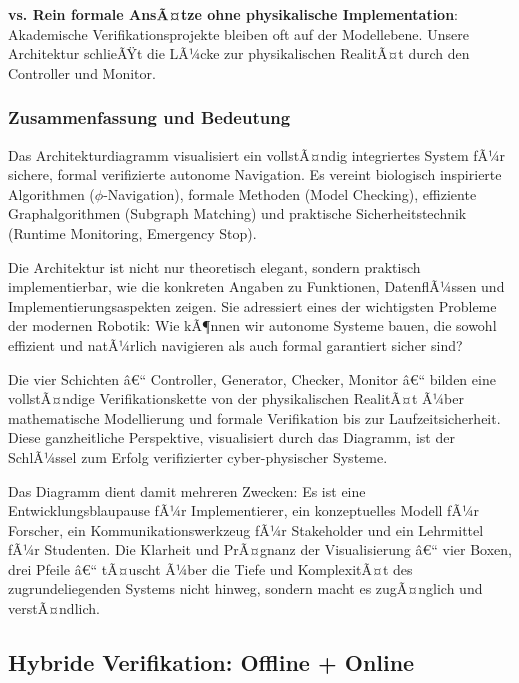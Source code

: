 ﻿\documentclass[a4paper,12pt]{article}
\theoremstyle{definition}
\begin{document}
\textbf{vs. Rein formale AnsÃ¤tze ohne physikalische Implementation}: Akademische Verifikationsprojekte bleiben oft auf der Modellebene. Unsere Architektur schlieÃŸt die LÃ¼cke zur physikalischen RealitÃ¤t durch den Controller und Monitor.

\subsubsection{Zusammenfassung und Bedeutung}

Das Architekturdiagramm visualisiert ein vollstÃ¤ndig integriertes System fÃ¼r sichere, formal verifizierte autonome Navigation. Es vereint biologisch inspirierte Algorithmen ($\phi$-Navigation), formale Methoden (Model Checking), effiziente Graphalgorithmen (Subgraph Matching) und praktische Sicherheitstechnik (Runtime Monitoring, Emergency Stop).

Die Architektur ist nicht nur theoretisch elegant, sondern praktisch implementierbar, wie die konkreten Angaben zu Funktionen, DatenflÃ¼ssen und Implementierungsaspekten zeigen. Sie adressiert eines der wichtigsten Probleme der modernen Robotik: Wie kÃ¶nnen wir autonome Systeme bauen, die sowohl effizient und natÃ¼rlich navigieren als auch formal garantiert sicher sind?

Die vier Schichten â€“ Controller, Generator, Checker, Monitor â€“ bilden eine vollstÃ¤ndige Verifikationskette von der physikalischen RealitÃ¤t Ã¼ber mathematische Modellierung und formale Verifikation bis zur Laufzeitsicherheit. Diese ganzheitliche Perspektive, visualisiert durch das Diagramm, ist der SchlÃ¼ssel zum Erfolg verifizierter cyber-physischer Systeme.

Das Diagramm dient damit mehreren Zwecken: Es ist eine Entwicklungsblaupause fÃ¼r Implementierer, ein konzeptuelles Modell fÃ¼r Forscher, ein Kommunikationswerkzeug fÃ¼r Stakeholder und ein Lehrmittel fÃ¼r Studenten. Die Klarheit und PrÃ¤gnanz der Visualisierung â€“ vier Boxen, drei Pfeile â€“ tÃ¤uscht Ã¼ber die Tiefe und KomplexitÃ¤t des zugrundeliegenden Systems nicht hinweg, sondern macht es zugÃ¤nglich und verstÃ¤ndlich.

\subsection{Hybride Verifikation: Offline + Online}
\end{document}
